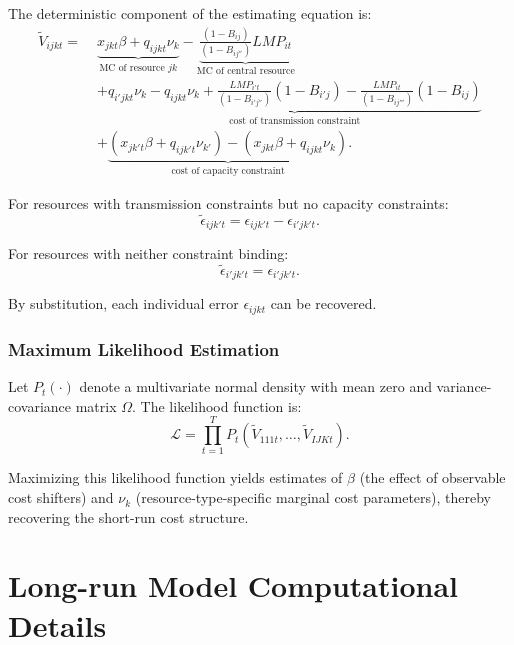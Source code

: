 \documentclass[12pt]{article}
\begin{document}
The deterministic component of the estimating equation is:
\begin{align}\label{eq:V}
    \tilde{V}_{ijkt} = \; & \underbrace{x_{jkt} \beta + q_{ijkt} \nu_k}_{\text{MC of resource } jk} - \underbrace{\frac{(1 - B_{ij})}{(1 - B_{ij''})} LMP_{it}}_{\text{MC of central resource}} \nonumber \\
    & + \underbrace{q_{i'jkt} \nu_k - q_{ijkt} \nu_k + \frac{LMP_{i't}}{(1 - B_{i'j''})}(1 - B_{i'j}) - \frac{LMP_{it}}{(1 - B_{ij'''})}(1 - B_{ij})}_{\text{cost of transmission constraint}} \nonumber \\
    & + \underbrace{(x_{jk't} \beta + q_{ijk't} \nu_{k'}) - (x_{jkt} \beta + q_{ijkt} \nu_k)}_{\text{cost of capacity constraint}}.
\end{align}

For resources with transmission constraints but no capacity constraints:
\begin{equation}
    \tilde{\epsilon}_{ijk't} = \epsilon_{ijk't} - \epsilon_{i'jk't}.
\end{equation}

For resources with neither constraint binding:
\begin{equation}
    \tilde{\epsilon}_{i'jk't} = \epsilon_{i'jk't}.
\end{equation}

By substitution, each individual error $\epsilon_{ijkt}$ can be recovered.

\subsubsection{Maximum Likelihood Estimation}

Let $P_t(\cdot)$ denote a multivariate normal density with mean zero and variance-covariance matrix $\Omega$. The likelihood function is:
\begin{equation}\label{eq:likelihood}
    \mathcal{L} = \prod_{t=1}^{T} P_t\left(\tilde{V}_{111t}, \ldots, \tilde{V}_{IJKt}\right).
\end{equation}

Maximizing this likelihood function yields estimates of $\beta$ (the effect of observable cost shifters) and $\nu_k$ (resource-type-specific marginal cost parameters), thereby recovering the short-run cost structure.

\section{Long-run Model Computational Details} \label{sec:appendixb}
\end{document}
